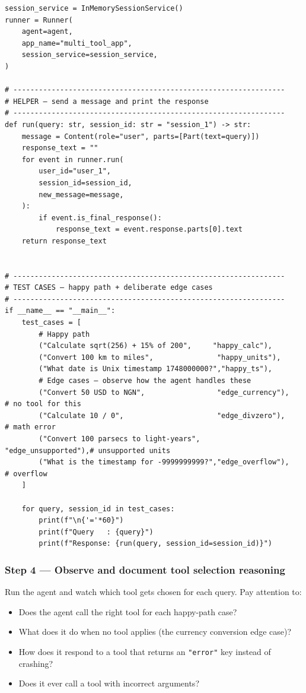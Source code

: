 \documentclass[12pt, a4paper]{article}
\begin{document}
\begin{practicalbox}
\begin{lstlisting}[style=pythonstyle, caption={multi\_tool\_agent.py --- agent with three registered tools}]
session_service = InMemorySessionService()
runner = Runner(
    agent=agent,
    app_name="multi_tool_app",
    session_service=session_service,
)

# ----------------------------------------------------------------
# HELPER — send a message and print the response
# ----------------------------------------------------------------
def run(query: str, session_id: str = "session_1") -> str:
    message = Content(role="user", parts=[Part(text=query)])
    response_text = ""
    for event in runner.run(
        user_id="user_1",
        session_id=session_id,
        new_message=message,
    ):
        if event.is_final_response():
            response_text = event.response.parts[0].text
    return response_text


# ----------------------------------------------------------------
# TEST CASES — happy path + deliberate edge cases
# ----------------------------------------------------------------
if __name__ == "__main__":
    test_cases = [
        # Happy path
        ("Calculate sqrt(256) + 15% of 200",     "happy_calc"),
        ("Convert 100 km to miles",               "happy_units"),
        ("What date is Unix timestamp 1748000000?","happy_ts"),
        # Edge cases — observe how the agent handles these
        ("Convert 50 USD to NGN",                 "edge_currency"),   # no tool for this
        ("Calculate 10 / 0",                      "edge_divzero"),    # math error
        ("Convert 100 parsecs to light-years",    "edge_unsupported"),# unsupported units
        ("What is the timestamp for -9999999999?","edge_overflow"),   # overflow
    ]

    for query, session_id in test_cases:
        print(f"\n{'='*60}")
        print(f"Query   : {query}")
        print(f"Response: {run(query, session_id=session_id)}")
\end{lstlisting}

\subsubsection*{Step 4 --- Observe and document tool selection reasoning}

Run the agent and watch which tool gets chosen for each query. Pay attention to:

\begin{itemize}[leftmargin=*, itemsep=2pt]
  \item Does the agent call the right tool for each happy-path case?
  \item What does it do when no tool applies (the currency conversion edge case)?
  \item How does it respond to a tool that returns an \texttt{"error"} key instead of crashing?
  \item Does it ever call a tool with incorrect arguments?
\end{itemize}


\end{practicalbox}
\end{document}
